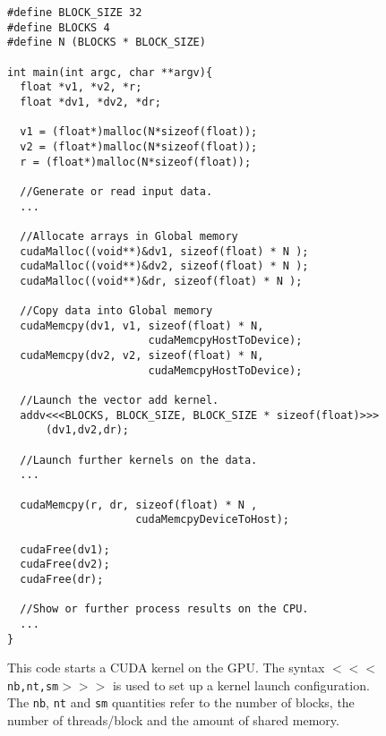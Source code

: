 \begin{figure}
\begin{small}
\begin{verbatim}
#define BLOCK_SIZE 32
#define BLOCKS 4 
#define N (BLOCKS * BLOCK_SIZE)

int main(int argc, char **argv){
  float *v1, *v2, *r;
  float *dv1, *dv2, *dr;
  
  v1 = (float*)malloc(N*sizeof(float));
  v2 = (float*)malloc(N*sizeof(float)); 
  r = (float*)malloc(N*sizeof(float));

  //Generate or read input data.
  ... 

  //Allocate arrays in Global memory
  cudaMalloc((void**)&dv1, sizeof(float) * N ); 
  cudaMalloc((void**)&dv2, sizeof(float) * N ); 
  cudaMalloc((void**)&dr, sizeof(float) * N ); 
  
  //Copy data into Global memory
  cudaMemcpy(dv1, v1, sizeof(float) * N, 
                      cudaMemcpyHostToDevice);
  cudaMemcpy(dv2, v2, sizeof(float) * N, 
                      cudaMemcpyHostToDevice);
  
  //Launch the vector add kernel.
  addv<<<BLOCKS, BLOCK_SIZE, BLOCK_SIZE * sizeof(float)>>>
      (dv1,dv2,dr);
  
  //Launch further kernels on the data.
  ... 
  
  cudaMemcpy(r, dr, sizeof(float) * N , 
                    cudaMemcpyDeviceToHost);
  
  cudaFree(dv1);
  cudaFree(dv2);
  cudaFree(dr);
  
  //Show or further process results on the CPU. 
  ... 
}

\end{verbatim}
\end{small} 
\caption{This code starts a CUDA kernel on  
the GPU. The syntax $<<<${\tt nb,nt,sm}$>>>$ is used to set up a kernel
launch configuration. The {\tt nb}, {\tt nt} and {\tt sm} quantities refer to 
the number of blocks, the number of threads/block and the amount of shared 
memory.}
\label{fig:cudaCoord}
\end{figure}



